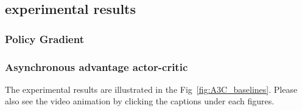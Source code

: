 \subsection{experimental results}




\subsubsection{Policy Gradient}





\subsubsection{Asynchronous advantage actor-critic}
The experimental results are illustrated in the Fig~\ref{fig:A3C_baselines}. Please also
see the video animation by clicking the captions under each figures. 

